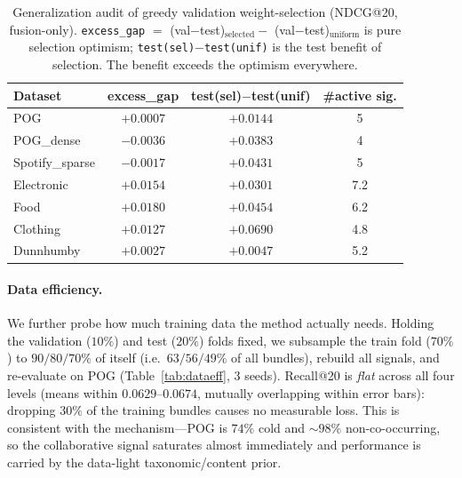 \begin{table}[t]\centering\small
\caption{Generalization audit of greedy validation weight-selection (NDCG@20, fusion-only). \texttt{excess\_gap}
$=$ (val$-$test)$_{\text{selected}} - $ (val$-$test)$_{\text{uniform}}$ is pure selection optimism;
\texttt{test(sel)$-$test(unif)} is the test benefit of selection. The benefit exceeds the optimism everywhere.}
\label{tab:valgap}
\setlength{\tabcolsep}{5pt}
\begin{tabular}{lccc}
\toprule
Dataset & excess\_gap & test(sel)$-$test(unif) & \#active sig. \\
\midrule
POG             & $+0.0007$ & $+0.0144$ & 5 \\
POG\_dense      & $-0.0036$ & $+0.0383$ & 4 \\
Spotify\_sparse & $-0.0017$ & $+0.0431$ & 5 \\
Electronic      & $+0.0154$ & $+0.0301$ & 7.2 \\
Food            & $+0.0180$ & $+0.0454$ & 6.2 \\
Clothing        & $+0.0127$ & $+0.0690$ & 4.8 \\
Dunnhumby       & $+0.0027$ & $+0.0047$ & 5.2 \\
\bottomrule
\end{tabular}
\end{table}

\paragraph{Data efficiency.}
We further probe how much training data the method actually needs. Holding the validation ($10\%$) and test ($20\%$)
folds fixed, we subsample the train fold ($70\%$) to $90/80/70\%$ of itself (i.e.\ $63/56/49\%$ of all bundles),
rebuild all signals, and re-evaluate on \textsc{POG} (Table~\ref{tab:dataeff}, 3 seeds). Recall@20 is \emph{flat}
across all four levels (means within $0.0629$--$0.0674$, mutually overlapping within error bars): dropping $30\%$ of
the training bundles causes no measurable loss. This is consistent with the mechanism---\textsc{POG} is $74\%$ cold and
${\sim}98\%$ non-co-occurring, so the collaborative signal saturates almost immediately and performance is carried by
the data-light taxonomic/content prior.

